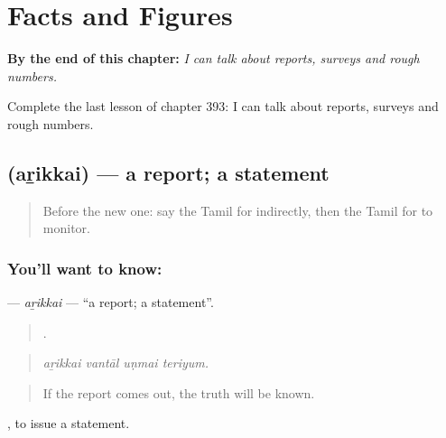 
\chapter{Facts and Figures}
\label{ch:ta-facts-and-figures}

\begin{chapteropening}
\textbf{By the end of this chapter:} \emph{I can talk about reports, surveys and rough numbers.}

Complete the last lesson of chapter 393: I can talk about reports, surveys and rough numbers.
\end{chapteropening}

\section[\texorpdfstring{\ta{அறிக்கை} (aṟikkai)}{அறிக்கை (aṟikkai)}]{ (aṟikkai) — a report; a statement}

\label{lesson:TA-C393-arikkai}



\begin{quote}
Before the new one: say the Tamil for indirectly, then the Tamil for to monitor.
\end{quote}

\subsection*{You'll want to know: }
\textbf{} — \emph{aṟikkai} — \textquotedblleft{}a report; a statement\textquotedblright{}.

\begin{quote}
   .
\end{quote}

\begin{quote}
\emph{aṟikkai vantāl uṇmai teriyum.}
\end{quote}

\begin{quote}
If the report comes out, the truth will be known.
\end{quote}

 , to issue a statement.

